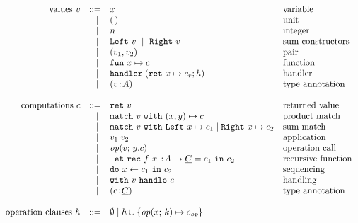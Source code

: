 
\[
	\begin{array}{rrll}
		\text{values}~v
		 & ::=   & x                      			& \text{variable}          \\
		 & \vsep & \unit												& \text{unit}							 \\
		 & \vsep & n														& \text{integer}					 \\
		 & \vsep & \inleft{v}~\vsep~\inright{v} & \text{sum constructors}  \\
		 & \vsep & \pair{v_1}{v_2}							&	\text{pair}						 	 \\
		 & \vsep & \fun{x}{c}             			& \text{function}          \\
		 & \vsep & \handler{h}      						& \text{handler}           \\
		 & \vsep & (v \oftype A)                & \text{type annotation}   \\
		 \\
		 \text{computations}~c
		 & ::=   & \return{v}             		& \text{returned value}    				\\
		 & \vsep & \match{v} \pair{x}{y} \mapsto c 	 		& \text{product match} 	\\
		 & \vsep & \match{v} \sumcases{x}{c_1}{x}{c_2} 	& \text{sum match} 			\\
		 & \vsep & \apply{v_1}{v_2}       		& \text{application}       				\\
		 & \vsep & \operation{v}{y.c}     		& \text{operation call}    				\\
     & \vsep & \letrecann{f}{x}{\tyA \to \ctyC}{c_1} {c_2}
                                          & \text{recursive function} 			\\
		 & \vsep & \dobind{x}{c_1}{c_2}   		& \text{sequencing}        				\\
		 & \vsep & \withhandle{v}{c}      		& \text{handling}					 				\\
		 & \vsep & (c \oftype \ctyC)          & \text{type annotation}          \\     
     \\
		 \text{operation clauses}~h
			& ::=   & \emptyhcases 
			\vsep 		h \union \set{\operation{x}{k} \mapsto c_{\op}} 	\\
		\end{array}
		\]
